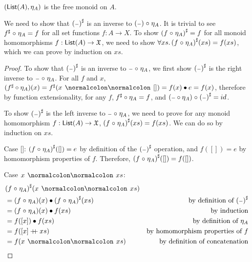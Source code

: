 \begin{propositionrep}
    $(\operatorname{\mathsf{List}}(A),\eta_A)$ is the free monoid on $A$.
\end{propositionrep}

\begin{proofsketch}
    We need to show that ${({\scriptstyle{-}})}^{\sharp}$ is an inverse to $({\scriptstyle{-}}) \mathrel{\circ} \eta_A$.
    It is trivial to see ${f}^{\sharp} \mathrel{\circ} \eta_A = f$ for all set functions $f : A \to X$.
    To show ${(f \mathrel{\circ} \eta_A)}^{\sharp} = f$ for all monoid homomorphisms $f : \operatorname{\mathsf{List}}(A) \to \mathfrak{X}$,
    we need to show $\forall xs.\, {(f \mathrel{\circ} \eta_A)}^{\sharp}(xs) = f(xs)$, which we can prove by induction on $xs$.
\end{proofsketch}

\begin{proof}
    To show that ${({\scriptstyle{-}})}^{\sharp}$ is an inverse to ${\scriptstyle{-}} \mathrel{\circ} \eta_A$,
    we first show ${({\scriptstyle{-}})}^{\sharp}$ is the right inverse to ${\scriptstyle{-}} \mathrel{\circ} \eta_A$.
    For all $f$ and $x$, $(\ext{f} \circ \eta_A)(x) = \ext{f}(x \cons []) = f(x) \mult e = f(x)$,
    therefore by function extensionality, for any $f$, ${f}^{\sharp} \circ \eta_A = f$,
    and $({\scriptstyle{-}} \circ \eta_A) \mathrel{\circ} {({\scriptstyle{-}})}^{\sharp} = id$.

    To show ${({\scriptstyle{-}})}^{\sharp}$ is the left inverse to ${\scriptstyle{-}} \mathrel{\circ} \eta_A$, we need to prove
    for any monoid homomorphism $f : \operatorname{\mathsf{List}}(A) \to \mathfrak{X}$, ${(f \mathrel{\circ} \eta_A)}^{\sharp}(xs) = f(xs)$.
    We can do so by induction on $xs$.

    Case []: ${(f \mathrel{\circ} \eta_A)}^{\sharp}([]) = e$ by definition of the ${({\scriptstyle{-}})}^{\sharp}$ operation,
    and $f([]) = e$ by homomorphism properties of $f$. Therefore, ${(f \mathrel{\circ} \eta_A)}^{\sharp}([]) = f([])$.

    Case $x \cons xs$:
    \begin{align*}
         & \ext{(f \comp \eta_A)}(x \cons xs)                                                                \\
         & = (f \comp \eta_A)(x) \mult \ext{(f \comp \eta_A)}(xs) & \text{by definition of $\ext{(\blank)}$} \\
         & = (f \comp \eta_A)(x) \mult f(xs)                      & \text{by induction}                      \\
         & = f([x]) \mult f(xs)                                   & \text{by definition of $\eta_A$}         \\
         & = f([x] \doubleplus xs)                                & \text{by homomorphism properties of $f$} \\
         & = f(x \cons xs)                                        & \text{by definition of concatenation}
    \end{align*}


\end{proof}
